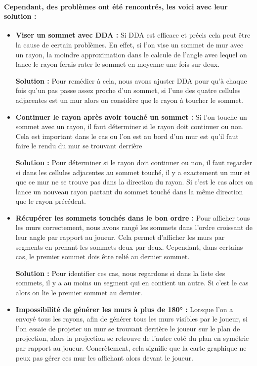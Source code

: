 \documentclass[11pt]{article}
\begin{document}
\paragraph{Cependant, des problèmes ont été rencontrés, les voici avec leur solution :}
\begin{itemize}
	\item \textbf{Viser un sommet avec DDA : } Si DDA est efficace et précis cela peut être la cause de certain problèmes. 
	En effet, si l'on vise un sommet de mur avec un rayon, la moindre approximation dans le calcule de l'angle avec lequel on 
	lance le rayon ferais rater le sommet en moyenne une fois sur deux.

	\textbf{Solution : }Pour remédier à cela, nous avons ajuster DDA pour qu'à chaque fois qu'un pas
	passe assez proche d'un sommet, si l'une des quatre cellules adjacentes est
	un mur alors on considère que le rayon à toucher le sommet.

	\item \textbf{Continuer le rayon après avoir touché un sommet :} Si l'on touche un sommet avec 
	un rayon, il faut déterminer si le rayon doit continuer ou non. Cela est important dans le cas ou l'on 
	est au bord d'un mur est qu'il faut faire le rendu du mur se trouvant derrière

	\textbf{Solution : }Pour déterminer si le rayon doit continuer ou non, il faut regarder si
	dans les cellules adjacentes au sommet touché, il y a exactement un mur et que ce mur
	ne se trouve pas dans la direction du rayon. Si c'est le cas alors on lance un nouveau rayon 
	partant du sommet touché dans la même direction que le rayon précédent.

	\item \textbf{Récupérer les sommets touchés dans le bon ordre :} Pour afficher tous les murs correctement,
	nous avons rangé les sommets dans l'ordre croissant de leur angle par rapport au joueur. Cela permet d'afficher
	les murs par segments en prenant les sommets deux par deux. Cependant, dans certains cas, le premier sommet 
	dois être relié au dernier sommet.

	\textbf{Solution : }Pour identifier ces cas, nous regardons si dans la liste des sommets, il y a au moins
	un segment qui en contient un autre. Si c'est le cas alors on lie le premier sommet au dernier.

	\item \textbf{Impossibilité de générer les murs à plus de 180° :} Lorsque l'on a envoyé tous les rayons,
	afin de générer tous les murs visibles par le joueur, si l'on essaie de projeter un mur se trouvant derrière
	le joueur sur le plan de projection, alors la projection se retrouve de l'autre coté du plan en symétrie 
	par rapport au joueur. Concrètement, cela signifie que la carte graphique ne peux pas gérer ces mur les
	affichant alors devant le joueur.


\end{itemize}
\end{document}
